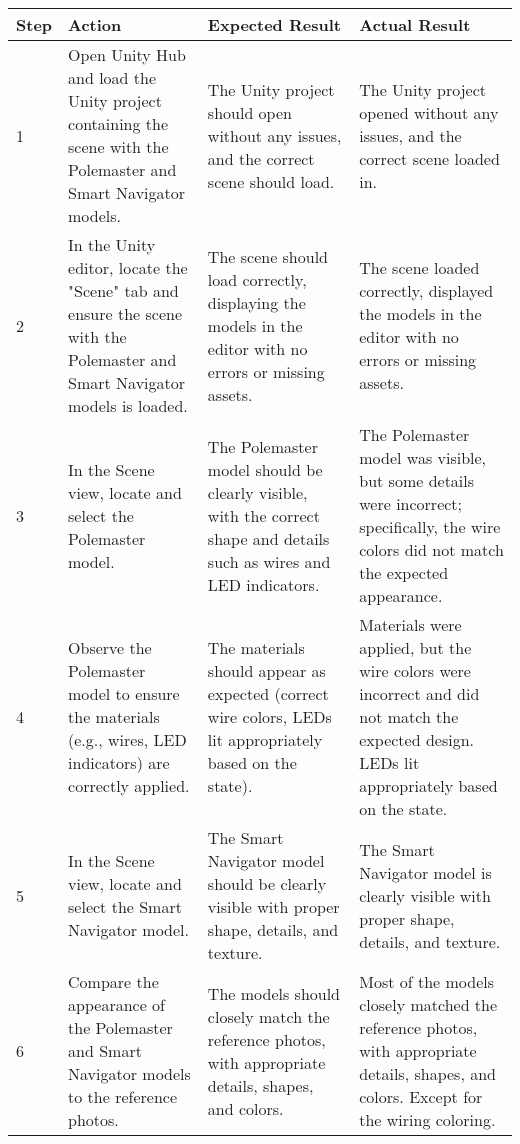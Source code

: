 \documentclass[11pt]{article}
\begin{document}
\begin{tabular}{@{} p{0.8cm} p{4.6cm} p{4.6cm} p{4.6cm} @{}}
\toprule
\textbf{Step} & \textbf{Action} & \textbf{Expected Result} & \textbf{Actual Result} \\
\midrule
1 & Open Unity Hub and load the Unity project containing the scene with the Polemaster and Smart Navigator models. & The Unity project should open without any issues, and the correct scene should load. & The Unity project opened without any issues, and the correct scene loaded in. \\
2 & In the Unity editor, locate the "Scene" tab and ensure the scene with the Polemaster and Smart Navigator models is loaded. & The scene should load correctly, displaying the models in the editor with no errors or missing assets. & The scene loaded correctly, displayed the models in the editor with no errors or missing assets. \\
3 & In the Scene view, locate and select the Polemaster model. & The Polemaster model should be clearly visible, with the correct shape and details such as wires and LED indicators. & The Polemaster model was visible, but some details were incorrect; specifically, the wire colors did not match the expected appearance. \\
4 & Observe the Polemaster model to ensure the materials (e.g., wires, LED indicators) are correctly applied. & The materials should appear as expected (correct wire colors, LEDs lit appropriately based on the state). & Materials were applied, but the wire colors were incorrect and did not match the expected design. LEDs lit appropriately based on the state. \\
5 & In the Scene view, locate and select the Smart Navigator model. & The Smart Navigator model should be clearly visible with proper shape, details, and texture. & The Smart Navigator model is clearly visible with proper shape, details, and texture. \\
6 & Compare the appearance of the Polemaster and Smart Navigator models to the reference photos. & The models should closely match the reference photos, with appropriate details, shapes, and colors. & Most of the models closely matched the reference photos, with appropriate details, shapes, and colors. Except for the wiring coloring. \\
\bottomrule
\end{tabular}
\end{document}

